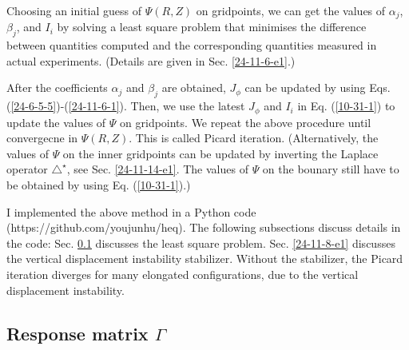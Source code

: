 \documentclass{llncs}
\newcommand{\tmtexttt}[1]{\text{{\ttfamily{#1}}}}
\begin{document}
Choosing an initial guess of $\Psi (R, Z)$ on gridpoints, we can get the
values of $\alpha_j$, $\beta_j$, and $I_i$ by solving a least square problem
that minimises the difference between quantities computed and the
corresponding quantities measured in actual experiments. (Details are given in
Sec. \ref{24-11-6-e1}.)

After the coefficients $\alpha_j$ and $\beta_j$ are obtained, $J_{\phi}$ can
be updated by using Eqs. (\ref{24-6-5-5})-(\ref{24-11-6-1}). Then, we use the
latest $J_{\phi}$ and $I_i$ in Eq. (\ref{10-31-1}) to update the values of
$\Psi$ on gridpoints. We repeat the above procedure until convergecne in $\Psi
(R, Z)$. This is called Picard iteration. (Alternatively, the values of $\Psi$
on the inner gridpoints can be updated by inverting the Laplace operator
$\triangle^{\star}$, see Sec. \ref{24-11-14-e1}. The values of $\Psi$ on the
bounary still have to be obtained by using Eq. (\ref{10-31-1}).)

I implemented the above method in a Python code \tmtexttt{HEQ}
(https://github.com/youjunhu/heq). The following subsections discuss details
in the code: Sec. \ref{24-11-8-e3} discusses the least square problem. Sec.
\ref{24-11-8-e1} discusses the vertical displacement instability stabilizer.
Without the stabilizer, the Picard iteration diverges for many elongated
configurations, due to the vertical displacement instability.

\subsection{Response matrix $\Gamma$}\label{24-11-8-e3}\label{24-11-6-e1}
\end{document}
